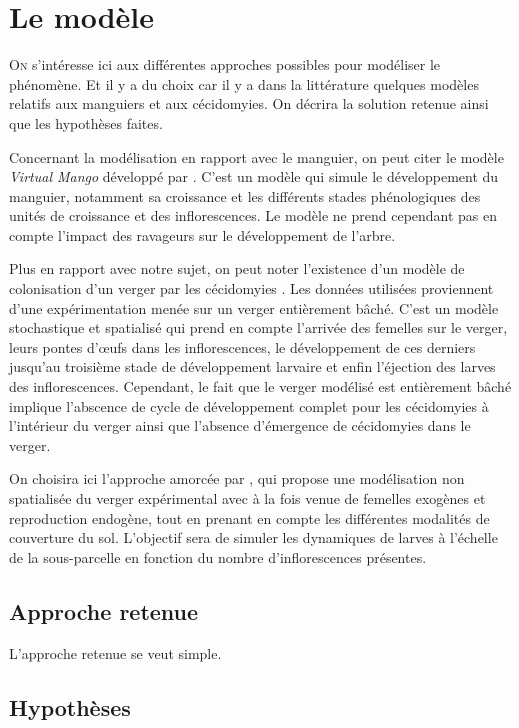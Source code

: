 \chapter{Le modèle}

\lettrine{O}{n} s'intéresse ici aux différentes approches possibles pour modéliser le phénomène. 
Et il y a du choix car il y a dans la littérature quelques modèles relatifs aux manguiers et aux cécidomyies.
On décrira la solution retenue ainsi que les hypothèses faites.

Concernant la modélisation en rapport avec le manguier, on peut citer le modèle \emph{Virtual Mango} développé par \citet{fred}.
C'est un modèle qui simule le développement du manguier, notamment sa croissance et les différents stades phénologiques des unités de croissance et des inflorescences.
Le modèle ne prend cependant pas en compte l'impact des ravageurs sur le développement de l'arbre.

Plus en rapport avec notre sujet, on peut noter l'existence d'un modèle de colonisation d'un verger par les cécidomyies \citep{paul}. 
Les données utilisées proviennent d'une expérimentation menée sur un verger entièrement bâché. 
C'est un modèle stochastique et spatialisé qui prend en compte l'arrivée des femelles sur le verger, leurs pontes d'œufs dans les inflorescences, le développement de ces derniers jusqu'au troisième stade de développement larvaire et enfin l'éjection des larves des inflorescences.
Cependant, le fait que le verger modélisé est entièrement bâché implique l'abscence de cycle de développement complet pour les cécidomyies à l'intérieur du verger ainsi que l'absence d'émergence de cécidomyies dans le verger.

On choisira ici l'approche amorcée par \citet{laurie}, qui propose une modélisation non spatialisée du verger expérimental avec à la fois venue de femelles exogènes et reproduction endogène, tout en prenant en compte les différentes modalités de couverture du sol.
L'objectif sera de simuler les dynamiques de larves à l'échelle de la sous-parcelle en fonction du nombre d'inflorescences présentes.

\section{Approche retenue}

L'approche retenue se veut simple. 

\section{Hypothèses}

